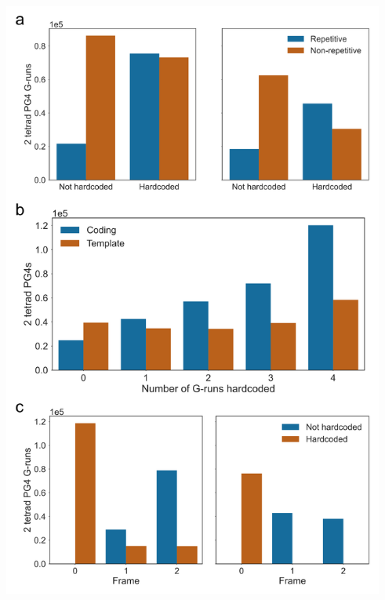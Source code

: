 \documentclass[12pt,a4paper,]{report}
\let\origfigure=\figure
\let\endorigfigure=\endfigure
\renewenvironment{figure}[1][2] {
    \expandafter\origfigure\expandafter[H]
} {
    \endorigfigure
}
\begin{document}
\newpage

\begin{figure}[htbp]
\centering
\includegraphics[width=\textwidth,height=562pt,keepaspectratio]{chapter_4/figures/pg4_g_run_hardcoded_freq.png}
\caption[54\% of CDS PG4 G-runs are hardcoded by protein sequence.]{\textbf{54\%   of   CDS   PG4   G-runs   are   hardcoded   by   protein   sequence.}   \textbf{a)}   Frequency   plot   showing   the   total   number   of   G-runs   contributing   to   PG4s   which   are   hardcoded   and   repetitive.   Left   and   right   panels   show   frequencies   on   coding   and   template   strands,   respectively.   Hardcoded   G-runs   are   defined   as   those   GG   dinucleotides   that   cannot   be   removed   from   the   sequence   without   changing   the   amino   acid   sequence   which   is   coded   for.   Repetitive   G-runs   are   defined   as   those   which   contribute   to   PG4s   where   all   G-runs   are   part   of   codons   which   encode   the   same   sequence.   \textbf{b)}   Frequency   plot   showing   the   total   number   of   hardcoded   G-runs   for   each   overlapping   PG4   register   on   the   coding   (blue)   and   template   (orange)   strands,   respectively.   \textbf{c)}   Frequency   plots   showing   start   frame   of   CDS   G-runs   vs. hardcoded   status.   Left   and   right   panels   show   frequencies   on   coding   and   template   strands,   respectively.   \label{hardcoded}}
\end{figure}
\end{document}
